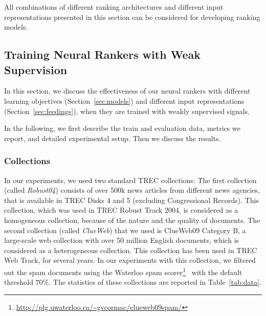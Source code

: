 \medskip
All combinations of different ranking architectures and different input representations presented in this section can be considered for developing ranking models.

\subsection{Training Neural Rankers with Weak Supervision}
\label{sec:neuralranking_expermients}
In this section,  we discuss the effectiveness of our neural rankers with different learning objectives (Section~\ref{sec:models}) and different input representations (Section~\ref{sec:feedings}), when they are trained with weakly supervised signals.

In the following, we first describe the train and evaluation data, metrics we report, and detailed experimental setup. Then we discuss the results.


\subsubsection{Collections}
\label{sec:collections}
In our experiments, we used two standard TREC collections: The first collection (called \emph{Robust04}) consists of over 500k news articles from different news agencies, that is available in TREC Disks 4 and 5 (excluding Congressional Records). This collection, which was used in TREC Robust Track 2004, is considered as a homogeneous collection, because of the nature and the quality of documents. The second collection (called \emph{ClueWeb}) that we used is ClueWeb09 Category B, a large-scale web collection with over 50 million English documents, which is considered as a heterogeneous collection. This collection has been used in TREC Web Track, for several years. In our experiments with this collection, we filtered out the spam documents using the Waterloo spam scorer\footnote{\url{http://plg.uwaterloo.ca/~gvcormac/clueweb09spam/}}~\citep{Cormack:2011} with the default threshold $70\%$. The statistics of these collections are reported in Table~\ref{tab:data}. 

